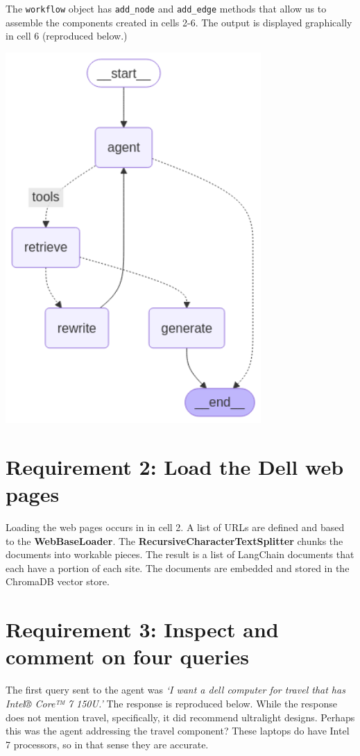 \documentclass[11pt,letterpaper]{article}
\begin{document}
    The \texttt{workflow} object has \texttt{add\_node} and \texttt{add\_edge} methods that allow us to assemble the 
    components created in cells 2-6. The output is displayed graphically in cell 6 (reproduced below.)
    \begin{center}
        \includegraphics[height=400pt]{Assignment_02_NOTEBOOK_Geidel_5_0.png}
    \end{center}

    \clearpage

\section*{Requirement 2: Load the Dell web pages}
\tab Loading the web pages occurs in in cell 2. A list of URLs are defined and based to the \textbf{WebBaseLoader}.
The \textbf{RecursiveCharacterTextSplitter} chunks the documents into workable pieces. The result is a list of LangChain documents that each have
a portion of each site. The documents are embedded and stored in the ChromaDB vector store.

\section*{Requirement 3: Inspect and comment on four queries}
\tab The first query sent to the agent was \textit{`I want a dell computer for travel that has Intel® Core™ 7 150U.'} The response is reproduced below.
While the response does not mention travel, specifically, it did recommend ultralight designs. Perhaps this was the agent addressing the travel component?
These laptops do have Intel 7 processors, so in that sense they are accurate.
\end{document}
